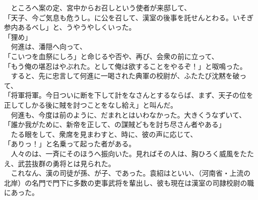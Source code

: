 \documentclass[
  paper=a5,
  fontsize=10pt,
  jafontsize=9.5pt,
  tate,                  %
  open_bracket_pos=nibu, %
]{jlreq}
\begin{document}
　ところへ案の定、宮中からお召しという使者が来邸して、\\


「天子、今ご気息も危うし。に公を召して、漢室の後事を託せんとわる。いそぎ参内あるべし」と、うやうやしくいった。\\


「狸め」\\


　何進は、潘隠へ向って、\\


「こいつを血祭にしろ」と命じるや否や、再び、会衆の前に立って、\\


「もう俺の堪忍はやぶれた。として俺は欲することをやるぞ！」と呶鳴った。\\


　すると、先に忠言して何進に一喝された典軍の校尉が、ふたたび沈黙を破って、\\


「将軍将軍。今日ついに断を下して計をなさんとするならば、まず、天子の位を正してしかる後に賊を討つことをなし給え」と叫んだ。\\


　何進も、今度は前のように、だまれとはいわなかった。大きくうなずいて、\\


「誰か我がために、新帝を正して、の謀賊どもを討ち尽さん者やある」\\


　たる眼をして、衆席を見まわすと、時に、彼の声に応じて、\\


「ありっ！」と名乗って起った者がある。\\


　人々のは、一斉にそのほうへ振向いた。見ればその人は、胸ひろく威風をたたえ、武芸抜群の勇将とは見られた。\\


　これなん、漢の司徒が孫、が子、であった。袁紹はといい、（河南省・上流の北岸）の名門で門下に多数の吏事武将を輩出し、彼も現在は漢室の司隷校尉の職にあった。\\
\end{document}
